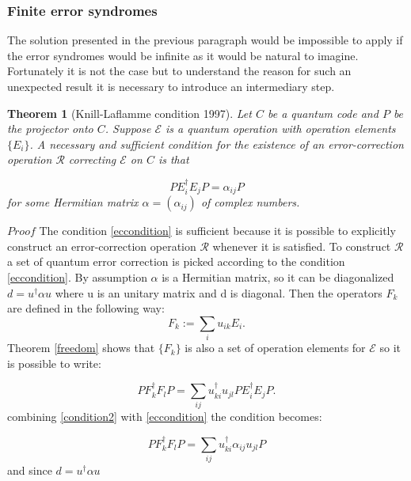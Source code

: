 \documentclass{article}
\newtheorem{theorem}{Theorem}
\begin{document}
\subsubsection{Finite error syndromes}

The solution presented in the previous paragraph would be impossible to
apply if the error syndromes would be infinite as it would be natural to
imagine.
Fortunately it is not the case but to understand the reason for such
an unexpected result it is necessary to introduce an intermediary step.

\begin{theorem}[Knill-Laflamme condition 1997]
	\label{conditions}
	Let $C$ be a quantum code and $P$ be the projector onto $C$.
	Suppose $\mathcal{E}$ is a quantum operation with operation elements $\{E_i\}$.
	A necessary and sufficient condition for the existence of an error-correction
	operation $\mathcal{R}$ correcting $\mathcal{E}$ on $C$ is that

	\begin{equation}
		P E_i^\dagger E_j P = \alpha_{ij} P
		\label{eccondition}
	\end{equation}
	for some Hermitian matrix $\alpha = (\alpha_{ij})$ of complex numbers.
\end{theorem}


\noindent $Proof$ \hspace{10pt}
The condition \ref{eccondition} is sufficient because it
is possible to explicitly construct an error-correction operation
$\mathcal{R}$ whenever it is satisfied.
To construct $\mathcal{R}$ a set of quantum error correction is picked
according to the condition \ref{eccondition}.
By assumption $\alpha$ is a Hermitian matrix, so it can be diagonalized
$d =u^\dagger \alpha u$ where u is an unitary matrix and d is diagonal.
Then the operators $F_k$ are defined in the following way:
\begin{equation}
	F_k := \sum_i u_{ik} E_i.
\end{equation}
Theorem \ref{freedom} shows that $\{F_k\}$ is also a set of operation
elements for $\mathcal{E}$ so it is possible to write:

\begin{equation}
	\label{condition2}
	P F_k^\dagger F_l P = \sum_{ij} u_{ki}^\dagger u_{jl} P E_{i}^\dagger E_j P.
\end{equation}
combining \ref{condition2} with \ref{eccondition}
the condition becomes:

\begin{equation}
	P F_k^\dagger F_l P = \sum_{ij} u_{ki}^\dagger \alpha_{ij} u_{jl} P
\end{equation}
and since $d = u^\dagger \alpha u$
\end{document}
